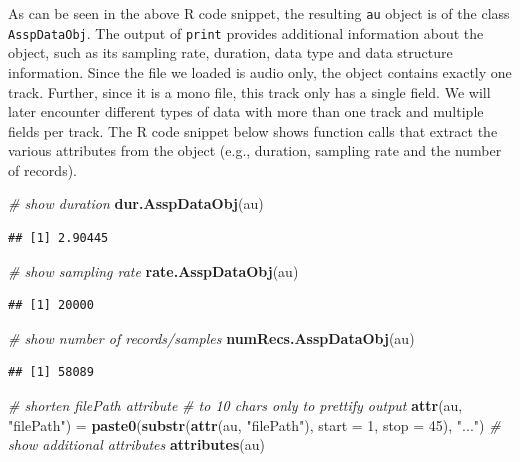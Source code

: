 \documentclass[]{book}
\newenvironment{Shaded}{\begin{snugshade}}{\end{snugshade}}
\newcommand{\CommentTok}[1]{\textcolor[rgb]{0.56,0.35,0.01}{\textit{#1}}}
\newcommand{\DataTypeTok}[1]{\textcolor[rgb]{0.13,0.29,0.53}{#1}}
\newcommand{\DecValTok}[1]{\textcolor[rgb]{0.00,0.00,0.81}{#1}}
\newcommand{\KeywordTok}[1]{\textcolor[rgb]{0.13,0.29,0.53}{\textbf{#1}}}
\newcommand{\NormalTok}[1]{#1}
\newcommand{\StringTok}[1]{\textcolor[rgb]{0.31,0.60,0.02}{#1}}
\begin{document}
As can be seen in the above R code snippet, the resulting \texttt{au} object is of the class \texttt{AsspDataObj}. The output of \texttt{print} provides additional information about the object, such as its sampling rate, duration, data type and data structure information. Since the file we loaded is audio only, the object contains exactly one track. Further, since it is a mono file, this track only has a single field. We will later encounter different types of data with more than one track and multiple fields per track. The R code snippet below shows function calls that extract the various attributes from the object (e.g., duration, sampling rate and the number of records).

\begin{Shaded}
\begin{Highlighting}[]
\CommentTok{# show duration}
\KeywordTok{dur.AsspDataObj}\NormalTok{(au)}
\end{Highlighting}
\end{Shaded}

\begin{verbatim}
## [1] 2.90445
\end{verbatim}

\begin{Shaded}
\begin{Highlighting}[]
\CommentTok{# show sampling rate}
\KeywordTok{rate.AsspDataObj}\NormalTok{(au)}
\end{Highlighting}
\end{Shaded}

\begin{verbatim}
## [1] 20000
\end{verbatim}

\begin{Shaded}
\begin{Highlighting}[]
\CommentTok{# show number of records/samples}
\KeywordTok{numRecs.AsspDataObj}\NormalTok{(au)}
\end{Highlighting}
\end{Shaded}

\begin{verbatim}
## [1] 58089
\end{verbatim}

\begin{Shaded}
\begin{Highlighting}[]
\CommentTok{# shorten filePath attribute}
\CommentTok{# to 10 chars only to prettify output}
\KeywordTok{attr}\NormalTok{(au, }\StringTok{"filePath"}\NormalTok{)  =}\StringTok{ }\KeywordTok{paste0}\NormalTok{(}\KeywordTok{substr}\NormalTok{(}\KeywordTok{attr}\NormalTok{(au, }\StringTok{"filePath"}\NormalTok{),}
                                      \DataTypeTok{start =} \DecValTok{1}\NormalTok{,}
                                      \DataTypeTok{stop =} \DecValTok{45}\NormalTok{), }\StringTok{"..."}\NormalTok{)}
\CommentTok{# show additional attributes}
\KeywordTok{attributes}\NormalTok{(au)}
\end{Highlighting}
\end{Shaded}
\end{document}
